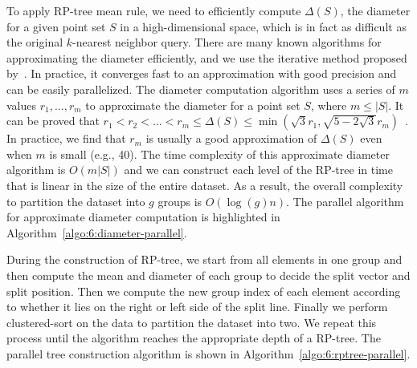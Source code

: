 To apply RP-tree mean rule, we need to efficiently compute $\Delta(S)$, the diameter for a given point set $S$ in a high-dimensional space, which is in fact as difficult as the original $k$-nearest neighbor query. There are many known algorithms for approximating the diameter efficiently, and we use the iterative method proposed by~\cite{Egecioglu:1989:ADS}. In practice, it converges fast to an approximation with good precision and can be easily parallelized. The diameter computation algorithm uses a series of $m$ values $r_1, ..., r_m$ to approximate the diameter for a point set $S$, where $m \leq |S|$. It can be proved that $r_1 < r_2 < ... < r_m \leq \Delta(S) \leq \min(\sqrt{3}r_1, \sqrt{5-2\sqrt{3}}r_m)$~\cite{Egecioglu:1989:ADS}. In practice, we find that $r_m$ is usually a good approximation of $\Delta(S)$ even when $m$ is small (e.g., 40). The time complexity of this approximate diameter algorithm is $O(m|S|)$ and we can construct each level of the RP-tree in time that is linear in the size of the entire dataset. As a result, the overall complexity to partition the dataset into $g$ groups is $O(\log(g) n)$. The parallel algorithm for approximate diameter computation is highlighted in Algorithm~\ref{algo:6:diameter-parallel}.

During the construction of RP-tree, we start from all elements in one group and then compute the mean and diameter of each group to decide the split vector and split position. Then we compute the new group index of each element according to whether it lies on the right or left side of the split line. Finally we perform clustered-sort on the data to partition the dataset into two. We repeat this process until the algorithm reaches the appropriate depth of a RP-tree. The parallel tree construction algorithm is shown in Algorithm~\ref{algo:6:rptree-parallel}.

